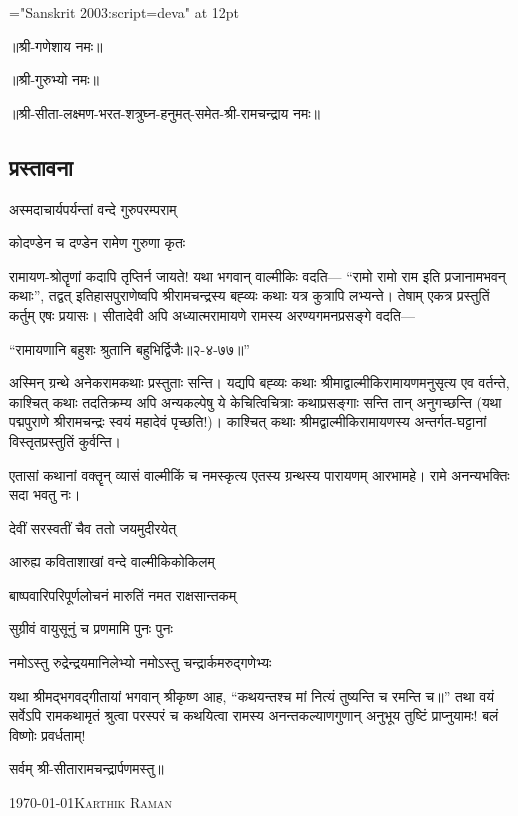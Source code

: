 {\font \x="Sanskrit 2003:script=deva" at 12pt\x
\centerline{॥श्री-गणेशाय नमः॥}
\centerline{॥श्री-गुरुभ्यो नमः॥}
\centerline{॥श्री-सीता-लक्ष्मण-भरत-शत्रुघ्न-हनुमत्-समेत-श्री-रामचन्द्राय नमः॥}
}
\thispagestyle{empty}

\begin{center}
\chapter*{{प्रस्तावना}}
\end{center}

{अस्मदाचार्यपर्यन्तां वन्दे गुरुपरम्पराम्}

{कोदण्डेन च दण्डेन रामेण गुरुणा कृतः}

रामायण-श्रोतॄणां कदापि तृप्तिर्न जायते! यथा भगवान् वाल्मीकिः वदति--- ``रामो रामो राम इति प्रजानामभवन् कथाः'', तद्वत् इतिहासपुराणेष्वपि श्रीरामचन्द्रस्य बह्व्यः कथाः यत्र कुत्रापि लभ्यन्ते। तेषाम् एकत्र प्रस्तुतिं कर्तुम् एषः प्रयासः। सीतादेवी अपि अध्यात्मरामायणे रामस्य अरण्यगमनप्रसङ्गे वदति---

\centerline{``रामायणानि बहुशः श्रुतानि बहुभिर्द्विजैः॥२-४-७७॥''} 

अस्मिन् ग्रन्थे अनेकरामकथाः प्रस्तुताः सन्ति। यद्यपि बह्व्यः कथाः श्रीमाद्वाल्मीकिरामायण\-मनुसृत्य एव वर्तन्ते, काश्चित् कथाः तदतिक्रम्य अपि अन्यकल्पेषु ये केचित्विचित्राः कथाप्रसङ्गाः सन्ति तान् अनुगच्छन्ति (यथा पद्मपुराणे श्रीरामचन्द्रः स्वयं महादेवं पृच्छति!)। काश्चित् कथाः श्रीमद्वाल्मीकिरामायणस्य अन्तर्गत-घट्टानां विस्तृतप्रस्तुतिं कुर्वन्ति।

एतासां कथानां वक्तॄन् व्यासं वाल्मीकिं च नमस्कृत्य एतस्य ग्रन्थस्य पारायणम् आरभामहे। रामे अनन्यभक्तिः सदा भवतु नः। 

{देवीं सरस्वतीं चैव ततो जयमुदीरयेत्}

{आरुह्य कविताशाखां वन्दे वाल्मीकिकोकिलम्}


{बाष्पवारिपरिपूर्णलोचनं मारुतिं नमत राक्षसान्तकम्}

{सुग्रीवं वायुसूनुं च प्रणमामि पुनः पुनः}

{नमोऽस्तु रुद्रेन्द्रयमानिलेभ्यो नमोऽस्तु चन्द्रार्कमरुद्गणेभ्यः}

यथा श्रीमद्भगवद्\-गीतायां भगवान् श्रीकृष्ण आह, ``कथयन्तश्च मां नित्यं तुष्यन्ति च रमन्ति च॥'' तथा वयं सर्वेऽपि रामकथामृतं श्रुत्वा परस्परं च कथयित्वा रामस्य अनन्तकल्याणगुणान् अनुभूय तुष्टिं प्राप्नुयामः! बलं विष्णोः प्रवर्धताम्!\\



\centerline{सर्वम् श्री-सीतारामचन्द्रार्पणमस्तु॥}

\medskip
\noindent\today \hfill \textsc{Karthik Raman}
